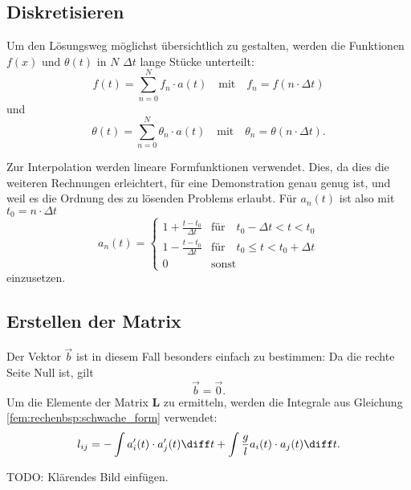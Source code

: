 \subsection{Diskretisieren}
Um den Lösungsweg möglichst übersichtlich zu gestalten, werden die Funktionen $f(x)$ und $\theta(t)$ in $N$ $\Delta t$ lange Stücke unterteilt:
\begin{equation}
    f(t) = \sum_{n=0}^{N} f_n \cdot a(t) \quad
    \text{mit} \quad
    f_n = f(n \cdot \Delta t)
\end{equation}
und
\begin{equation}
    \theta(t) = \sum_{n=0}^{N} \theta_n \cdot a(t) \quad
    \text{mit} \quad
    \theta_n = \theta(n \cdot \Delta t).
\end{equation}

Zur Interpolation werden lineare Formfunktionen verwendet.
Dies, da dies die weiteren Rechnungen erleichtert, für eine Demonstration genau genug ist, und weil es die Ordnung des zu lösenden Problems erlaubt.
Für $a_n(t)$ ist also mit $t_0 = n \cdot \Delta t$
\begin{equation}
    a_n(t) = \left\{ \begin{array}{ll}
        1+\frac{t-t_0}{\Delta t} & \text{für} \quad t_0 - \Delta t < t < t_0 \\
        1-\frac{t-t_0}{\Delta t} & \text{für} \quad t_0 \leq t < t_0 + \Delta t \\
        0 & \text{sonst}
    \end{array} \right.
\end{equation}
einzusetzen.


\subsection{Erstellen der Matrix}
Der Vektor $\vec{b}$ ist in diesem Fall besonders einfach zu bestimmen: Da die rechte Seite Null ist, gilt
\begin{equation}
    \vec{b} = \vec{0}.
\end{equation}
Um die Elemente der Matrix $\mathbf{L}$ zu ermitteln, werden die Integrale aus Gleichung \ref{fem:rechenbsp:schwache_form} verwendet:
\begin{equation}
    l_{ij} = - \int a_i'(t) \cdot a_j'(t) \diff t + \int \frac{g}{l} a_i(t) \cdot a_j(t) \diff t.
\end{equation}

TODO: Klärendes Bild einfügen.

